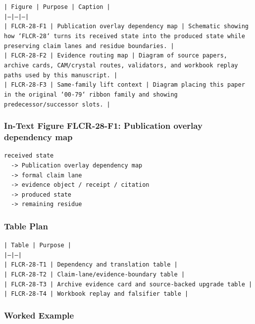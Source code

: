 \documentclass[11pt]{article}
\begin{document}
\noindent\texttt{| Figure | Purpose | Caption |}\\
\noindent\texttt{|---|---|---|}\\
\noindent\texttt{| FLCR-28-F1 | Publication overlay dependency map | Schematic showing how `FLCR-28` turns its received state into the produced state while preserving claim lanes and residue boundaries. |}\\
\noindent\texttt{| FLCR-28-F2 | Evidence routing map | Diagram of source papers, archive cards, CAM/crystal routes, validators, and workbook replay paths used by this manuscript. |}\\
\noindent\texttt{| FLCR-28-F3 | Same-family lift context | Diagram placing this paper in the original `00-79` ribbon family and showing predecessor/successor slots. |}\\

\subsubsection*{In-Text Figure FLCR-28-F1: Publication overlay dependency map}

\begin{verbatim}
received state
  -> Publication overlay dependency map
  -> formal claim lane
  -> evidence object / receipt / citation
  -> produced state
  -> remaining residue
\end{verbatim}

\subsubsection*{Table Plan}

\noindent\texttt{| Table | Purpose |}\\
\noindent\texttt{|---|---|}\\
\noindent\texttt{| FLCR-28-T1 | Dependency and translation table |}\\
\noindent\texttt{| FLCR-28-T2 | Claim-lane/evidence-boundary table |}\\
\noindent\texttt{| FLCR-28-T3 | Archive evidence card and source-backed upgrade table |}\\
\noindent\texttt{| FLCR-28-T4 | Workbook replay and falsifier table |}\\

\subsubsection*{Worked Example}
\end{document}
